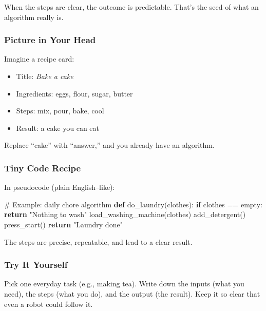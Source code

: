 \documentclass[
  letterpaper,
  DIV=11,
  numbers=noendperiod]{scrreprt}
\newenvironment{Shaded}{\begin{snugshade}}{\end{snugshade}}
\newcommand{\CommentTok}[1]{\textcolor[rgb]{0.37,0.37,0.37}{#1}}
\newcommand{\ControlFlowTok}[1]{\textcolor[rgb]{0.00,0.23,0.31}{\textbf{#1}}}
\newcommand{\KeywordTok}[1]{\textcolor[rgb]{0.00,0.23,0.31}{\textbf{#1}}}
\newcommand{\NormalTok}[1]{\textcolor[rgb]{0.00,0.23,0.31}{#1}}
\newcommand{\OperatorTok}[1]{\textcolor[rgb]{0.37,0.37,0.37}{#1}}
\newcommand{\StringTok}[1]{\textcolor[rgb]{0.13,0.47,0.30}{#1}}
\providecommand{\tightlist}{%
  \setlength{\itemsep}{0pt}\setlength{\parskip}{0pt}}
\begin{document}
When the steps are clear, the outcome is predictable. That's the seed of
what an algorithm really is.

\subsubsection{Picture in Your Head}\label{picture-in-your-head}

Imagine a recipe card:

\begin{itemize}
\tightlist
\item
  Title: \emph{Bake a cake}
\item
  Ingredients: eggs, flour, sugar, butter
\item
  Steps: mix, pour, bake, cool
\item
  Result: a cake you can eat
\end{itemize}

Replace ``cake'' with ``answer,'' and you already have an algorithm.

\subsubsection{Tiny Code Recipe}\label{tiny-code-recipe}

In pseudocode (plain English--like):

\begin{Shaded}
\begin{Highlighting}[]
\CommentTok{\# Example: daily chore algorithm}
\KeywordTok{def}\NormalTok{ do\_laundry(clothes):}
    \ControlFlowTok{if}\NormalTok{ clothes }\OperatorTok{==}\NormalTok{ empty:}
        \ControlFlowTok{return} \StringTok{"Nothing to wash"}
\NormalTok{    load\_washing\_machine(clothes)}
\NormalTok{    add\_detergent()}
\NormalTok{    press\_start()}
    \ControlFlowTok{return} \StringTok{"Laundry done"}
\end{Highlighting}
\end{Shaded}

The steps are precise, repeatable, and lead to a clear result.

\subsubsection{Try It Yourself}\label{try-it-yourself}

Pick one everyday task (e.g., making tea). Write down the inputs (what
you need), the steps (what you do), and the output (the result). Keep it
so clear that even a robot could follow it.
\end{document}
